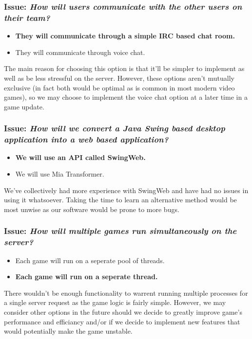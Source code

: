 \subsubsection*{Issue: \textit{How will users communicate with the other users on their team?}}

  \begin{itemize}
    \item \textbf{They will communicate through a simple IRC based chat room.}
    \item They will communicate through voice chat.
  \end{itemize}

The main reason for choosing this option is that it'll be simpler to implement as well as be less stressful on the server. However, these options aren't mutually exclusive (in fact both would be optimal as is common in most modern video games), so we may choose to implement the voice chat option at a later time in a game update.

\subsubsection*{Issue: \textit{How will we convert a Java Swing based desktop application into a web based application?}}

  \begin{itemize}
    \item \textbf{We will use an API called SwingWeb.}
    \item We will use Mia Transformer.
  \end{itemize}

We've collectively had more experience with SwingWeb and have had no issues in using it whatsoever. Taking the time to learn an alternative method would be most unwise as our software would be prone to more bugs.

\subsubsection*{Issue: \textit{How will multiple games run simultaneously on the server?}}

  \begin{itemize}
    \item Each game will run on a seperate pool of threads.
    \item \textbf{Each game will run on a seperate thread.}
  \end{itemize}

There wouldn't be enough functionality to warrent running multiple processes for a single server request as the game logic is fairly simple. However, we may consider other options in the future should we decide to greatly improve game's performance and efficiancy and/or if we decide to implement new features that would potentially make the game unstable.

